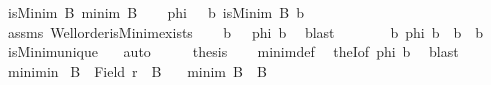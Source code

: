 \begin{isabellebody}
\ {\isachardoublequoteopen}isMinim\ B\ {\isacharparenleft}{\kern0pt}minim\ B{\isacharparenright}{\kern0pt}{\isachardoublequoteclose}\isanewline
%
\isadelimproof
%
\endisadelimproof
%
\isatagproof
{}\isamarkupfalse%
{\isacharminus}{\kern0pt}\isanewline
\ \ \isamarkupfalse%
\ {\isacharquery}{\kern0pt}phi\ {\isacharequal}{\kern0pt}\ {\isachardoublequoteopen}{\isacharparenleft}{\kern0pt}{\isasymlambda}\ b{\isachardot}{\kern0pt}\ isMinim\ B\ b{\isacharparenright}{\kern0pt}{\isachardoublequoteclose}\isanewline
\ \ \isamarkupfalse%
\ assms\ Well{\isacharunderscore}{\kern0pt}order{\isacharunderscore}{\kern0pt}isMinim{\isacharunderscore}{\kern0pt}exists\isanewline
\ \ \isamarkupfalse%
\ b\ \ {\isacharasterisk}{\kern0pt}{\isacharcolon}{\kern0pt}\ {\isachardoublequoteopen}{\isacharquery}{\kern0pt}phi\ b{\isachardoublequoteclose}\ \isamarkupfalse%
\ blast\isanewline
\ \ \isamarkupfalse%
\isanewline
\ \ \isamarkupfalse%
\ {\isachardoublequoteopen}{\isasymAnd}\ b{\isacharprime}{\kern0pt}{\isachardot}{\kern0pt}\ {\isacharquery}{\kern0pt}phi\ b{\isacharprime}{\kern0pt}\ {\isasymLongrightarrow}\ b{\isacharprime}{\kern0pt}\ {\isacharequal}{\kern0pt}\ b{\isachardoublequoteclose}\isanewline
\ \ \isamarkupfalse%
\ isMinim{\isacharunderscore}{\kern0pt}unique\ {\isacharasterisk}{\kern0pt}\ \isamarkupfalse%
\ auto\isanewline
\ \ \isamarkupfalse%
\ \isamarkupfalse%
\ {\isacharquery}{\kern0pt}thesis\isanewline
\ \ \isamarkupfalse%
\ minim{\isacharunderscore}{\kern0pt}def\ \isamarkupfalse%
\ theI{\isacharbrackleft}{\kern0pt}of\ {\isacharquery}{\kern0pt}phi\ b{\isacharbrackright}{\kern0pt}\ \isamarkupfalse%
\ blast\isanewline
{}\isamarkupfalse%
%
\endisatagproof
{\isafoldproof}%
%
\isadelimproof
%
\endisadelimproof
%
\isadelimdocument
%
\endisadelimdocument
%
\isatagdocument
%
\isamarkuptrue%
%
\endisatagdocument
{\isafolddocument}%
%
\isadelimdocument
%
\endisadelimdocument
{}\isamarkupfalse%
\ minim{\isacharunderscore}{\kern0pt}in{\isacharcolon}{\kern0pt}\isanewline
{}\ {\isachardoublequoteopen}B\ {\isasymle}\ Field\ r{\isachardoublequoteclose}\ \ {\isachardoublequoteopen}B\ {\isasymnoteq}\ {\isacharbraceleft}{\kern0pt}{\isacharbraceright}{\kern0pt}{\isachardoublequoteclose}\isanewline
{}\ {\isachardoublequoteopen}minim\ B\ {\isasymin}\ B{\isachardoublequoteclose}\isanewline

\end{isabellebody}
